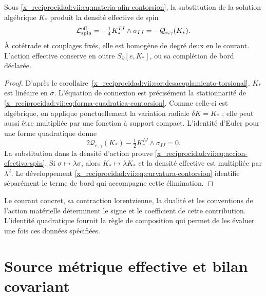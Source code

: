 \begin{HMTCompactSection}
\begin{theorem}
\label{x_reciprocidad:vii:thm:respuesta-cuadratica}
Sous \eqref{x_reciprocidad:vii:eq:materia-afin-contorsion}, la substitution de la
solution algébrique \(K_*\) produit la densité effective de spin
\begin{equation}
 \mathcal L_{\rm spin}^{\rm eff}
 =-\tfrac14 K_*^{IJ}\wedge\sigma_{IJ}
 =-\mathcal Q_{e,\gamma}(K_*).
 \label{x_reciprocidad:vii:eq:accion-efectiva-spin}
\end{equation}
À cotétrade et couplages fixés, elle est homogène de degré deux en
le courant. L'action effective conserve en outre
\(S_\partial[e,K_*]\), ou sa complétion de bord déclarée.
\end{theorem}
\begin{proof}
D'après le corollaire~\ref{x_reciprocidad:vii:cor:desacoplamiento-torsional},
\(K_*\) est linéaire en \(\sigma\). L'équation de connexion est
précisément la stationnarité de
\eqref{x_reciprocidad:vii:eq:forma-cuadratica-contorsion}. Comme celle-ci est algébrique,
on applique ponctuellement la variation radiale \(\delta K=K_*\) ;
elle peut aussi être multipliée par une fonction à support compact.
L'identité d'Euler pour une forme quadratique donne
\[
 2\mathcal Q_{e,\gamma}(K_*)
             -\tfrac12K_*^{IJ}\wedge\sigma_{IJ}=0.
\]
La substitution dans la densité d'action prouve \eqref{x_reciprocidad:vii:eq:accion-efectiva-spin}. Si \(\sigma\mapsto\lambda\sigma\), alors \(K_*\mapsto\lambda K_*\) et la densité effective est multipliée par \(\lambda^2\). Le développement \eqref{x_reciprocidad:vii:eq:curvatura-contorsion} identifie séparément le terme de bord qui accompagne cette élimination.
\end{proof}

Le courant concret, sa contraction lorentzienne, la dualité et les
conventions de l'action matérielle déterminent le signe et le coefficient
de cette contribution. L'identité quadratique fournit la règle de
composition qui permet de les évaluer une fois ces données spécifiées.

\section{Source métrique effective et bilan covariant}
\label{x_reciprocidad:vii:subsec:fuente-metrica-efectiva}


\end{HMTCompactSection}
